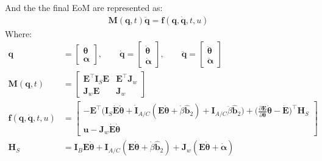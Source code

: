 \documentclass[titlepage]{article}
\begin{document}
\begin{mdframed}[linewidth=1pt, innertopmargin=10pt, innerbottommargin=10pt]
	And the the final EoM are represented as:
	\begin{equation}
		\begin{split}
			\boldsymbol{M}(\boldsymbol{q},t)\ddot{\boldsymbol{q}}=\boldsymbol{f}(\boldsymbol{q},\dot{\boldsymbol{q}},t,u)
		\end{split}
	\end{equation}
	Where:
	\begingroup
	\footnotesize
	\begin{equation}
		\begin{split}
			\boldsymbol{q}&=\begin{bmatrix}\boldsymbol{\theta}\\ \boldsymbol{\alpha}\end{bmatrix},\qquad\dot{\boldsymbol{q}}=\begin{bmatrix}\dot{\boldsymbol{\theta}}\\ \dot{\boldsymbol{\alpha}}\end{bmatrix},\qquad\ddot{\boldsymbol{q}}=\begin{bmatrix}\ddot{\boldsymbol{\theta}}\\ \ddot{\boldsymbol{\alpha}}\end{bmatrix} \\[6pt]
			\boldsymbol{M}(\boldsymbol{q},t)&=
			\begin{bmatrix}
				\boldsymbol{E}^\top\boldsymbol{I}_S\boldsymbol{E} & \boldsymbol{E}^\top\boldsymbol{J}_w \\
				\boldsymbol{J}_w\boldsymbol{E} & \boldsymbol{J}_w
			\end{bmatrix} \\[6pt]
			\boldsymbol{f}(\boldsymbol{q},\dot{\boldsymbol{q}},t,u)&=\!\!\!
			\begin{bmatrix}
				-\boldsymbol{E}^\top\big(\boldsymbol{I}_S\dot{\boldsymbol{E}}\dot{\boldsymbol{\theta}}+\dot{\boldsymbol{I}}_{A/C}(\boldsymbol{E}\dot{\boldsymbol{\theta}}+\dot{\beta}\hat{\boldsymbol{b}}_2)+\boldsymbol{I}_{A/C}\ddot{\beta}\hat{\boldsymbol{b}}_2\big)+\Big(\frac{\partial\boldsymbol{E}}{\partial\boldsymbol{\theta}}\dot{\boldsymbol{\theta}}-\dot{\boldsymbol{E}}\Big)^\top\boldsymbol{H}_S \\
				\boldsymbol{u}-\boldsymbol{J}_w\dot{\boldsymbol{E}}\dot{\boldsymbol{\theta}}
			\end{bmatrix} \\[6pt]
			\boldsymbol{H}_S&=\boldsymbol{I}_B\boldsymbol{E}\dot{\boldsymbol{\theta}}+\boldsymbol{I}_{A/C}\left(\boldsymbol{E}\dot{\boldsymbol{\theta}}+\dot{\beta}\hat{\boldsymbol{b}}_2\right)+\boldsymbol{J}_w\left(\boldsymbol{E}\dot{\boldsymbol{\theta}}+\dot{\boldsymbol{\alpha}}\right) \\[6pt]

\end{split}
\end{equation}
\end{mdframed}
\end{document}
